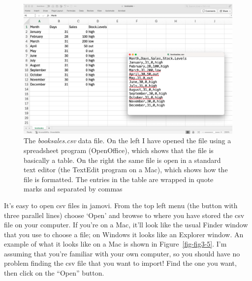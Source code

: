 \documentclass[
  a4paper,
]{book}
\begin{document}
\begin{figure}

\includegraphics[width=1\textwidth,height=\textheight]{images/fig3-4.png} \hfill{}

\caption{\label{fig-fig3-4}The \emph{booksales.csv} data file. On the
left I have opened the file using a spreadsheet program (OpenOffice),
which shows that the file is basically a table. On the right the same
file is open in a standard text editor (the TextEdit program on a Mac),
which shows how the file is formatted. The entries in the table are
wrapped in quote marks and separated by commas}

\end{figure}

It's easy to open csv files in jamovi. From the top left menu (the
button with three parallel lines) choose `Open' and browse to where you
have stored the csv file on your computer. If you're on a Mac, it'll
look like the usual Finder window that you use to choose a file; on
Windows it looks like an Explorer window. An example of what it looks
like on a Mac is shown in Figure~\ref{fig-fig3-5}. I'm assuming that
you're familiar with your own computer, so you should have no problem
finding the csv file that you want to import! Find the one you want,
then click on the ``Open'' button.
\end{document}
